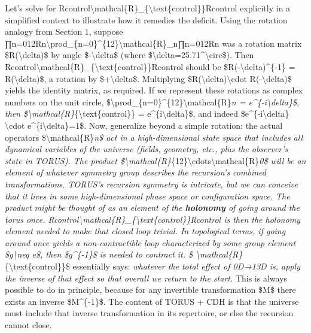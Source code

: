 \documentclass[
]{article}
\begin{document}
Let's solve for
Rcontrol\textbackslash mathcal\{R\}\_\{\textbackslash text\{control\}\}Rcontrol\hspace{0pt}
explicitly in a simplified context to illustrate how it remedies the
deficit. Using the rotation analogy from Section 1, suppose
∏n=012Rn\textbackslash prod\_\{n=0\}\^{}\{12\}\textbackslash mathcal\{R\}\_n∏n=012\hspace{0pt}Rn\hspace{0pt}
was a rotation matrix \$R(\textbackslash delta)\$ by angle
\$-\textbackslash delta\$ (where
\$\textbackslash delta=25.71\^{}\textbackslash circ\$). Then
Rcontrol\textbackslash mathcal\{R\}\_\{\textbackslash text\{control\}\}Rcontrol\hspace{0pt}
should be \$R(-\textbackslash delta)\^{}\{-1\} =
R(\textbackslash delta)\$, a rotation by \$+\textbackslash delta\$.
Multiplying \$R(\textbackslash delta)\textbackslash cdot
R(-\textbackslash delta)\$ yields the identity matrix, as required. If
we represent these rotations as complex numbers on the unit circle,
\$\textbackslash prod\_\{n=0\}\^{}\{12\}\textbackslash mathcal\{R\}\emph{n
= e\^{}\{-i\textbackslash delta\}\$, then
\$\textbackslash mathcal\{R\}}\{\textbackslash text\{control\}\} =
e\^{}\{i\textbackslash delta\}\$, and indeed
\$e\^{}\{-i\textbackslash delta\} \textbackslash cdot
e\^{}\{i\textbackslash delta\}=1\$. Now, generalize beyond a simple
rotation: the actual operators \$\textbackslash mathcal\{R\}\emph{n\$
act in a high-dimensional state space that includes all dynamical
variables of the universe (fields, geometry, etc., plus the observer's
state in TORUS). The product
\$\textbackslash mathcal\{R\}}\{12\}\textbackslash cdots\textbackslash mathcal\{R\}\emph{0\$
will be an element of whatever symmetry group describes the recursion's
combined transformations. TORUS's recursion symmetry is intricate, but
we can conceive that it lives in some high-dimensional phase space or
configuration space. The product might be thought of as an element of
the \textbf{holonomy} of going around the torus once.
Rcontrol\textbackslash mathcal\{R\}\_\{\textbackslash text\{control\}\}Rcontrol\hspace{0pt}
is then the holonomy element needed to make that closed loop trivial. In
topological terms, if going around once yields a non-contractible loop
characterized by some group element \$g\textbackslash neq e\$, then
\$g\^{}\{-1\}\$ is needed to contract it. \$
\textbackslash mathcal\{R\}}\{\textbackslash text\{control\}\}\$
essentially says: \emph{whatever the total effect of 0D→13D is, apply
the inverse of that effect so that overall we return to the start.} This
is always possible to do in principle, because for any invertible
transformation \$M\$ there exists an inverse \$M\^{}\{-1\}\$. The
content of TORUS + CDH is that the universe must include that inverse
transformation in its repertoire, or else the recursion cannot close.
\end{document}
